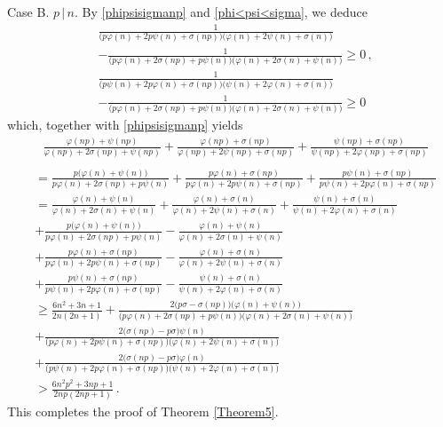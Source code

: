 \documentclass[12pt]{article}
\begin{document}
Case B.  \;  $p\,|\,n$. By \eqref{phipsisigmanp} and \eqref{phi<psi<sigma}, we deduce
\begin{align*}
&\frac{1}{\big(p\varphi(n)+2p\psi(n)+\sigma(np)\big)\big(\varphi(n)+2\psi(n)+\sigma(n)\big)}\\
&-\frac{1}{\big(p\varphi(n)+2\sigma(np)+p\psi(n)\big)\big(\varphi(n)+2\sigma(n)+\psi(n)\big)}\geq0\,,\\
&\frac{1}{\big(p\psi(n)+2p\varphi(n)+\sigma(np)\big)\big(\psi(n)+2\varphi(n)+\sigma(n)\big)}\\
&-\frac{1}{\big(p\varphi(n)+2\sigma(np)+p\psi(n)\big)\big(\varphi(n)+2\sigma(n)+\psi(n)\big)}\geq0
\end{align*}
which, together with \eqref{phipsisigmanp} yields
\begin{align*}
&\frac{\varphi(np)+\psi(np)}{\varphi(np)+2\sigma(np)+\psi(np)}+\frac{\varphi(np)+\sigma(np)}{\varphi(np)+2\psi(np)+\sigma(np)}+\frac{\psi(np)+\sigma(np)}{\psi(np)+2\varphi(np)+\sigma(np)}\\
\end{align*}
\begin{align*}
&=\frac{p\big(\varphi(n)+\psi(n)\big)}{p\varphi(n)+2\sigma(np)+p\psi(n)}+\frac{p\varphi(n)+\sigma(np)}{p\varphi(n)+2p\psi(n)+\sigma(np)}+\frac{p\psi(n)+\sigma(np)}{p\psi(n)+2p\varphi(n)+\sigma(np)}\\
&=\frac{\varphi(n)+\psi(n)}{\varphi(n)+2\sigma(n)+\psi(n)}+\frac{\varphi(n)+\sigma(n)}{\varphi(n)+2\psi(n)+\sigma(n)}+\frac{\psi(n)+\sigma(n)}{\psi(n)+2\varphi(n)+\sigma(n)}\\
&+\frac{p\big(\varphi(n)+\psi(n)\big)}{p\varphi(n)+2\sigma(np)+p\psi(n)}-\frac{\varphi(n)+\psi(n)}{\varphi(n)+2\sigma(n)+\psi(n)}\\
&+\frac{p\varphi(n)+\sigma(np)}{p\varphi(n)+2p\psi(n)+\sigma(np)}-\frac{\varphi(n)+\sigma(n)}{\varphi(n)+2\psi(n)+\sigma(n)}\\
&+\frac{p\psi(n)+\sigma(np)}{p\psi(n)+2p\varphi(n)+\sigma(np)}-\frac{\psi(n)+\sigma(n)}{\psi(n)+2\varphi(n)+\sigma(n)}\\
&\geq\frac{6n^2+3n+1}{2n(2n+1)}+\frac{2\big(p\sigma-\sigma(np)\big)\big(\varphi(n)+\psi(n)\big)}{\big(p\varphi(n)+2\sigma(np)+p\psi(n)\big)\big(\varphi(n)+2\sigma(n)+\psi(n)\big)}\\
&+\frac{2\big(\sigma(np)-p\sigma\big)\psi(n)}{\big(p\varphi(n)+2p\psi(n)+\sigma(np)\big)\big(\varphi(n)+2\psi(n)+\sigma(n)\big)}\\
&+\frac{2\big(\sigma(np)-p\sigma\big)\varphi(n)}{\big(p\psi(n)+2p\varphi(n)+\sigma(np)\big)\big(\psi(n)+2\varphi(n)+\sigma(n)\big)}\\
&>\frac{6n^2p^2+3np+1}{2np(2np+1)}\,.
\end{align*}
This completes the proof of Theorem \ref{Theorem5}.
\end{document}
